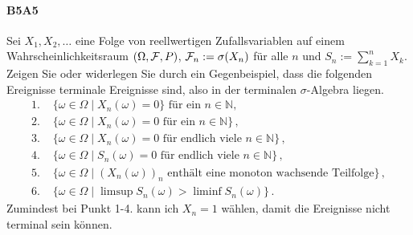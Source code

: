 \documentclass{article}
\begin{document}
\paragraph{B5A5}
Sei $X_1,X_2,\dots$ eine Folge von reellwertigen Zufallsvariablen auf einem Wahrscheinlichkeitsraum $(\Omega,{\cal F},P)$, ${\cal F}_n:=\sigma(X_n)$ für alle $n$ und $S_n:=\sum_{k=1}^nX_k$.
Zeigen Sie oder widerlegen Sie durch ein Gegenbeispiel, dass die folgenden Ereignisse terminale Ereignisse sind, also in der terminalen $\sigma$-Algebra liegen.
\begin{align*}
  \text{1.~}&\{\omega\in\Omega\mid X_n(\omega)=0\}\text{ für ein $n\in\mathbb{N}$,}\\
  \text{2.~}&\{\omega\in\Omega\mid X_n(\omega)=0\text{ für ein $n\in\mathbb{N}$}\}\,,\\
  \text{3.~}&\{\omega\in\Omega\mid X_n(\omega)=0\text{ für endlich viele $n\in\mathbb{N}$}\}\,,\\
  \text{4.~}&\{\omega\in\Omega\mid S_n(\omega)=0\text{ für endlich viele $n\in\mathbb{N}$}\}\,,\\
  \text{5.~}&\{\omega\in\Omega\mid (X_n(\omega))_n\text{ enthält eine monoton wachsende Teilfolge}\}\,,\\
  \text{6.~}&\{\omega\in\Omega\mid \limsup S_n(\omega)>\liminf S_n(\omega)\}\,.
\end{align*}
Zumindest bei Punkt 1-4. kann ich $X_n=1$ wählen, damit die Ereignisse nicht terminal sein können.
\newpage


\end{document}
